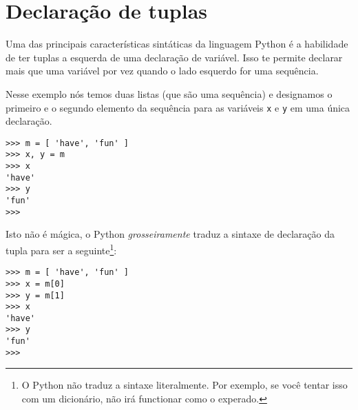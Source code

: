 \section{Declaração de tuplas}
\label{tuple assignment}


Uma das principais características sintáticas da linguagem Python é a habilidade
de ter tuplas a esquerda de uma declaração de variável. Isso te permite
declarar mais que uma variável por vez quando o lado esquerdo for uma sequência.

Nesse exemplo nós temos duas listas (que são uma sequência) e designamos o
primeiro e o segundo elemento da sequência para as variáveis {\tt x} e
{\tt y} em uma única declaração.

\beforeverb
\begin{verbatim}
>>> m = [ 'have', 'fun' ]
>>> x, y = m
>>> x
'have'
>>> y
'fun'
>>> 
\end{verbatim}
\afterverb
%
Isto não é mágica, o Python \emph{grosseiramente} traduz a sintaxe de
declaração da tupla para ser a seguinte\footnote{O Python não traduz a sintaxe
literalmente. Por exemplo, se você tentar isso com um dicionário, não irá
functionar como o experado.}:

\beforeverb
\begin{verbatim}
>>> m = [ 'have', 'fun' ]
>>> x = m[0]
>>> y = m[1]
>>> x
'have'
>>> y
'fun'
>>> 
\end{verbatim}
\afterverb

